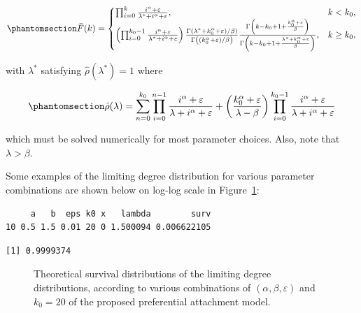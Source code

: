 \documentclass[
  sn-basic,
]{sn-jnl}
\theoremstyle{plain}
\theoremstyle{plain}
\theoremstyle{remark}
\begin{document}
\begin{equation}\phantomsection\label{eq-polysurv}{
\bar F(k) = \begin{cases}
\prod_{i=0}^{k}\frac{i^\alpha + \varepsilon}{\lambda^*+i^\alpha + \varepsilon},&k<k_0,\\
\left(\prod_{i=0}^{k_0-1}\frac{i^\alpha + \varepsilon}{\lambda^*+i^\alpha + \varepsilon}\right)\frac{\Gamma(\lambda^*+k_0^\alpha + \varepsilon)/\beta)}{\Gamma\left((k_0^\alpha + \varepsilon)/\beta\right)} \frac{\Gamma\left(k-k_0 + 1 +\frac{k_0^\alpha + \varepsilon}{\beta}\right)}{\Gamma\left(k-k_0 + 1 +\frac{\lambda^* +k_0^\alpha + \varepsilon}{\beta}\right)},&k\ge k_0,
\end{cases}
}\end{equation}

with \(\lambda^*\) satisfying \(\hat \rho(\lambda^*)=1\) where

\begin{equation}\phantomsection\label{eq-rho}{
\hat\rho(\lambda) = \sum_{n=0}^{k_0}\prod_{i=0}^{n-1}\frac{i^\alpha + \varepsilon}{\lambda+i^\alpha + \varepsilon} + \left(\frac{k_0^\alpha + \varepsilon}{\lambda-\beta}\right)\prod_{i=0}^{k_0-1}\frac{i^\alpha + \varepsilon}{\lambda + i^\alpha + \varepsilon} 
}\end{equation}

which must be solved numerically for most parameter choices. Also, note
that \(\lambda>\beta\).

Some examples of the limiting degree distribution for various parameter
combinations are shown below on log-log scale in
Figure~\ref{fig-polylinsurv}:

\begin{verbatim}
     a   b  eps k0 x   lambda        surv
10 0.5 1.5 0.01 20 0 1.500094 0.006622105
\end{verbatim}

\begin{verbatim}
[1] 0.9999374
\end{verbatim}

\begin{figure}


\caption{\label{fig-polylinsurv}Theoretical survival distributions of
the limiting degree distributions, according to various combinations of
\((\alpha, \beta, \varepsilon)\) and \(k_0=20\) of the proposed
preferential attachment model.}

\end{figure}%
\end{document}
